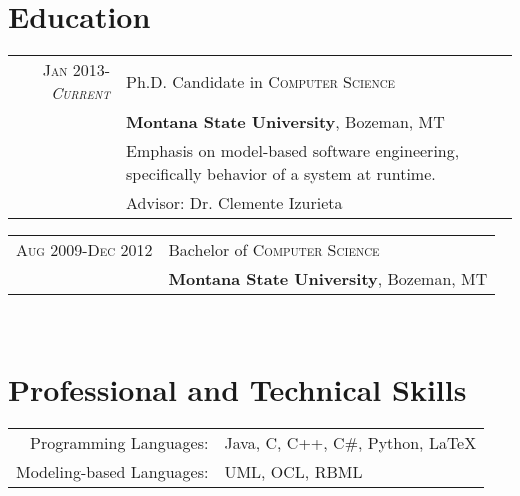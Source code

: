 \documentclass[a4paper,10pt]{article} %
\begin{document}

\section{Education}

\begin{tabular}{r|p{11cm}}

\textsc{Jan 2013-\emph{Current}} &Ph.D. Candidate in \textsc{Computer Science} \\& \normalsize\textbf{Montana State University}, Bozeman, MT\\

& Emphasis on model-based software engineering, specifically behavior of a system at runtime. \\
& \small Advisor: Dr. Clemente Izurieta\\ 
\end{tabular}

\begin{tabular}{r|p{11cm}}	

\textsc{Aug 2009-Dec 2012} & Bachelor of \textsc{Computer Science} \\& \normalsize\textbf{Montana State University}, Bozeman, MT\\


\end{tabular}
\\

\section{Professional and Technical Skills}
\begin{tabular}{rl}
Programming Languages: & Java, C, C++, C\#, Python, {\LaTeX}\setmainfont[SmallCapsFont=Fontin SmallCaps]{Fontin-Regular}\\

Modeling-based Languages: & UML, OCL, RBML\\
\end{tabular}\\


\newpage
\end{document}
